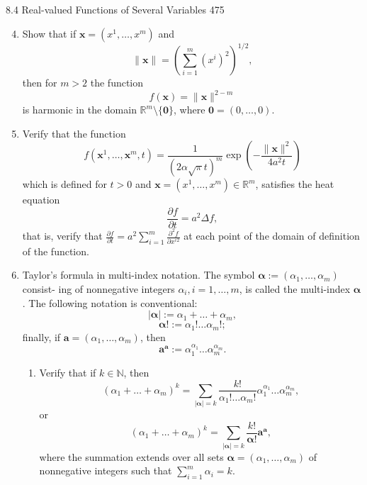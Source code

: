 8.4 Real-valued Functions of Several Variables
475
    \begin{enumerate}
        \setcounter{enumi}{3}
        \renewcommand{\theenumi}{\alph{enumi}}
        \item Show that if $\mathbf{x} = (x^1, \ldots, x^m)$ and
        \[
        \|\mathbf{x}\| = \left(\sum_{i=1}^m (x^i)^2\right)^{1/2},
        \]
        then for $m > 2$ the function
        \[
        f(\mathbf{x}) = \|\mathbf{x}\|^{2-m}
        \]
        is harmonic in the domain $\mathbb{R}^m \setminus \{\mathbf{0}\}$, where $\mathbf{0} = (0, \ldots, 0)$.
        \item Verify that the function
        \[
        f(\mathbf{x}^1, \ldots, \mathbf{x}^m, t) = \frac{1}{(2\alpha\sqrt{\pi}t)^m} \exp\left(-\frac{\|\mathbf{x}\|^2}{4a^2t}\right)
        \]
        which is defined for $t > 0$ and $\mathbf{x} = (x^1, \ldots, x^m) \in \mathbb{R}^m$, satisfies the heat equation
        \[
        \frac{\partial f}{\partial t} = a^2 \Delta f,
        \]
        that is, verify that $\frac{\partial f}{\partial t} = a^2 \sum_{i=1}^m \frac{\partial^2 f}{\partial x^i{}^2}$ at each point of the domain of definition of
        the function.
        \item Taylor's formula in multi-index notation. The symbol $\mathbf{\alpha} := (\alpha_1, \ldots, \alpha_m)$ consist-
        ing of nonnegative integers $\alpha_i, i = 1, \ldots, m$, is called the multi-index $\mathbf{\alpha}$.
        The following notation is conventional:
        \[
        |\mathbf{\alpha}| := \alpha_1 + \ldots + \alpha_m,
        \]
        \[
        \mathbf{\alpha}! := \alpha_1! \ldots \alpha_m!;
        \]
        finally, if $\mathbf{a} = (\alpha_1, \ldots, \alpha_m)$, then
        \[
        \mathbf{a}^\mathbf{a} := \alpha_1^{\alpha_1} \ldots \alpha_m^{\alpha_m}.
        \]
        \begin{enumerate}
            \item[(a)] Verify that if $k \in \mathbb{N}$, then
            \[
            (\alpha_1 + \ldots + \alpha_m)^k = \sum_{|\mathbf{\alpha}|=k} \frac{k!}{\alpha_1! \ldots \alpha_m!} \alpha_1^{\alpha_1} \ldots \alpha_m^{\alpha_m},
            \]
            or
            \[
            (\alpha_1 + \ldots + \alpha_m)^k = \sum_{|\mathbf{\alpha}|=k} \frac{k!}{\mathbf{\alpha}!} \mathbf{a}^\mathbf{a},
            \]
            where the summation extends over all sets $\mathbf{\alpha} = (\alpha_1, \ldots, \alpha_m)$ of nonnegative integers
            such that $\sum_{i=1}^m \alpha_i = k$.
        \end{enumerate}
    \end{enumerate}